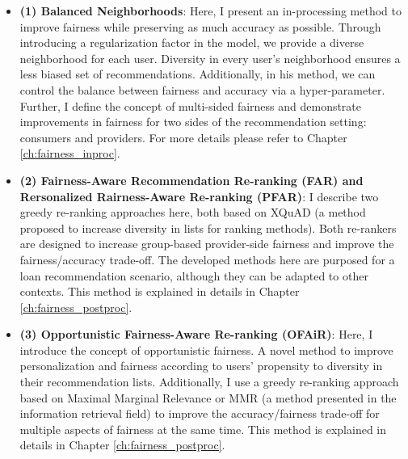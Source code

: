 \begin{itemize}
    \item \textbf{(1) Balanced Neighborhoods}:
    Here, I present an in-processing method to improve fairness while preserving as much accuracy as possible. Through introducing a regularization factor in the model, we provide a diverse neighborhood for each user. Diversity in every user's neighborhood ensures a less biased set of recommendations. Additionally, in his method, we can control the balance between fairness and accuracy via a hyper-parameter. Further, I define the concept of multi-sided fairness and demonstrate improvements in fairness for two sides of the recommendation setting: consumers and providers. For more details please refer to Chapter \ref{ch:fairness_inproc}.
    
    \item \textbf{(2) Fairness-Aware Recommendation Re-ranking (FAR) and Rersonalized Rairness-Aware Re-ranking (PFAR)}: 
    I describe two greedy re-ranking approaches here, both based on XQuAD \cite{santos2015search} (a method proposed to increase diversity in lists for ranking methods). Both re-rankers are designed to increase group-based provider-side fairness and improve the fairness/accuracy trade-off. The developed methods here are purposed for a loan recommendation scenario, although they can be adapted to other contexts. This method is explained in details in Chapter \ref{ch:fairness_postproc}.
    
    \item \textbf{(3) Opportunistic Fairness-Aware Re-ranking (OFAiR)}:
    Here, I introduce the concept of opportunistic fairness. A novel method to improve personalization and fairness according to users' propensity to diversity in their recommendation lists. Additionally, I use a greedy re-ranking approach based on Maximal Marginal Relevance or MMR \cite{xia2015learning} (a method presented in the information retrieval field) to improve the accuracy/fairness trade-off for multiple aspects of fairness at the same time. This method is explained in details in Chapter \ref{ch:fairness_postproc}.

    

\end{itemize}
